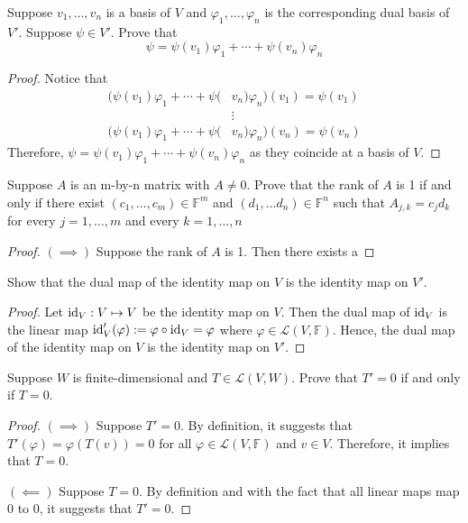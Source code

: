 \begin{exercise}
Suppose $v_1, \ldots ,v_n$ is a basis of $V$ and $\varphi_1, \ldots , \varphi_n$ is the corresponding dual basis of $V'$. Suppose $\psi \in V'$. Prove that \[
	\psi = \psi(v_1)\varphi_1 + \cdots + \psi(v_n)\varphi_n\]
\end{exercise}
\begin{proof}
	Notice that
	\begin{align*}
		(\psi(v_1)\varphi_1 + \cdots + \psi( & v_n)\varphi_n)(v_1) = \psi(v_1) \\
		                                     & \vdots                          \\
		(\psi(v_1)\varphi_1 + \cdots + \psi( & v_n)\varphi_n)(v_n) = \psi(v_n)
	\end{align*}
	Therefore, $\psi = \psi(v_1)\varphi_1 + \cdots + \psi(v_n)\varphi_n$ as they coincide at a basis of $V$.
\end{proof}
\begin{exercise}
Suppose $A $ is an m-by-n matrix with $A \neq 0$. Prove that the rank of $A$ is 1 if and only if there exist $(c_1, \ldots ,c_m) \in \mathbb{F}^m$ and $(d_1, \ldots d_n) \in \mathbb{F}^n$ such that $A_{j,k} = c_{j}d_{k}$ for every $j = 1, \ldots ,m$ and every $k = 1, \ldots ,n$
\end{exercise}
\begin{proof}
	\begin{comment}
	TODO: 3.G.11 Pending.
	\end{comment}
	$(\implies)$ Suppose the rank of $A$ is 1. Then there exists a
\end{proof}

\begin{exercise}
Show that the dual map of the identity map on $V$ is the identity map on $V'$.
\end{exercise}
\begin{proof}
	Let $\mathop{\mathrm{id}}_V : V \mapsto V$ be the identity map on $V$. Then the dual map of $\mathop{\mathrm{id}}_V$ is the linear map $\mathop{\mathrm{id}}'_{V}(\varphi) := \varphi \circ \mathop{\mathrm{id}}_V = \varphi$ where $\varphi \in \mathcal{L}(V, \mathbb{F})$. Hence, the dual map of the identity map on $V$ is the identity map on $V'$.
\end{proof}

\begin{exercise}
Suppose $W$ is finite-dimensional and $T \in \mathcal{L}(V,W)$. Prove that $T' = 0$ if and only if $T = 0$.
\end{exercise}
\begin{proof}
	$(\implies)$ Suppose $T' = 0$. By definition, it suggests that $T'(\varphi) = \varphi(T(v)) = 0$ for all $\varphi \in \mathcal{L}(V,\mathbb{F})$ and $v \in V$. Therefore, it implies that $T = 0$. \par
	$(\impliedby)$ Suppose $T = 0$. By definition and with the fact that all linear maps map 0 to 0, it suggests that $T' = 0$.
\end{proof}

